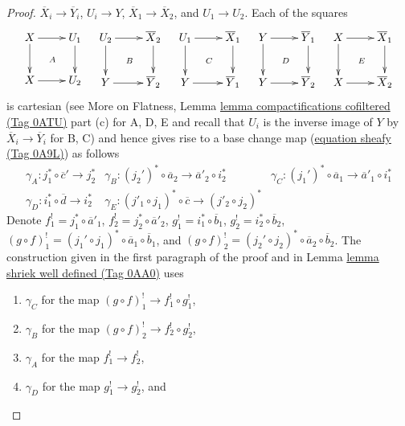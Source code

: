 \documentclass{amsart}
\theoremstyle{plain}
\theoremstyle{definition}
\theoremstyle{remark}
\numberwithin{equation}{subsection}
\begin{document}
\begin{proof}
$\overline{X}_i \to \overline{Y}_i$, $U_i \to Y$,
$\overline{X}_1 \to \overline{X}_2$, and $U_1 \to U_2$.
Each of the squares
$$
\xymatrix{
X \ar[r] \ar[d] \ar@{}[dr]|A & U_1 \ar[d] \\
X \ar[r] & U_2
}
\quad
\xymatrix{
U_2 \ar[r] \ar[d] \ar@{}[dr]|B & \overline{X}_2 \ar[d] \\
Y \ar[r] & \overline{Y}_2
}
\quad
\xymatrix{
U_1 \ar[r] \ar[d] \ar@{}[dr]|C & \overline{X}_1 \ar[d] \\
Y \ar[r] & \overline{Y}_1
}
\quad
\xymatrix{
Y \ar[r] \ar[d] \ar@{}[dr]|D & \overline{Y}_1 \ar[d] \\
Y \ar[r] & \overline{Y}_2
}
\quad
\xymatrix{
X \ar[r] \ar[d] \ar@{}[dr]|E & \overline{X}_1 \ar[d] \\
X \ar[r] & \overline{X}_2
}
$$
is cartesian (see
More on Flatness, Lemma \href{https://stacks.math.columbia.edu/tag/0ATU}{lemma compactifications cofiltered (Tag 0ATU)} part (c)
for A, D, E and recall that $U_i$ is the inverse image of $Y$
by $\overline{X}_i \to \overline{Y}_i$ for B, C) and hence
gives rise to a base change map (\href{https://stacks.math.columbia.edu/tag/0A9L}{equation sheafy (Tag 0A9L)}) as follows
$$
\begin{matrix}
\gamma_A : j_1^* \circ \overline{c}' \to j_2^* &
\gamma_B : (j_2')^* \circ \overline{a}_2 \to \overline{a}'_2 \circ i_2^* &
\gamma_C : (j_1')^* \circ \overline{a}_1 \to \overline{a}'_1 \circ i_1^* \\
\gamma_D : i_1^* \circ \overline{d} \to i_2^* &
\gamma_E : (j'_1 \circ j_1)^* \circ \overline{c} \to (j'_2 \circ j_2)^*
\end{matrix}
$$
Denote $f_1^! = j_1^* \circ \overline{a}'_1$,
$f_2^! = j_2^* \circ \overline{a}'_2$,
$g_1^! = i_1^* \circ \overline{b}_1$,
$g_2^! = i_2^* \circ \overline{b}_2$,
$(g \circ f)_1^! =
(j_1' \circ j_1)^* \circ \overline{a}_1 \circ \overline{b}_1$, and
$(g \circ f)^!_2 =
(j_2' \circ j_2)^* \circ \overline{a}_2 \circ \overline{b}_2$.
The construction given in the first paragraph of the proof
and in Lemma \href{https://stacks.math.columbia.edu/tag/0AA0}{lemma shriek well defined (Tag 0AA0)} uses
\begin{enumerate}
\item $\gamma_C$ for the map $(g \circ f)^!_1 \to f_1^! \circ g_1^!$,
\item $\gamma_B$ for the map $(g \circ f)^!_2 \to f_2^! \circ g_2^!$,
\item $\gamma_A$ for the map $f_1^! \to f_2^!$,
\item $\gamma_D$ for the map $g_1^! \to g_2^!$, and

\end{enumerate}
\end{proof}
\end{document}
